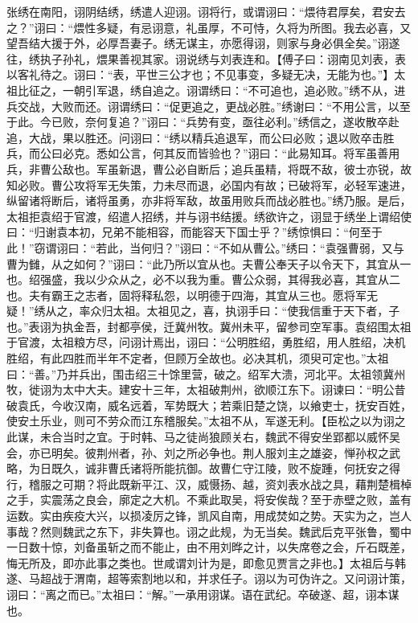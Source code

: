\documentclass[12pt,UTF8]{ctexbook}
\begin{document}
张绣在南阳，诩阴结绣，绣遣人迎诩。诩将行，或谓诩曰：“煨待君厚矣，君安去之？”诩曰：“煨性多疑，有忌诩意，礼虽厚，不可恃，久将为所图。我去必喜，又望吾结大援于外，必厚吾妻子。绣无谋主，亦愿得诩，则家与身必俱全矣。”诩遂往，绣执子孙礼，煨果善视其家。诩说绣与刘表连和。【傅子曰：诩南见刘表，表以客礼待之。诩曰：“表，平世三公才也；不见事变，多疑无决，无能为也。”】太祖比征之，一朝引军退，绣自追之。诩谓绣曰：“不可追也，追必败。”绣不从，进兵交战，大败而还。诩谓绣曰：“促更追之，更战必胜。”绣谢曰：“不用公言，以至于此。今已败，奈何复追？”诩曰：“兵势有变，亟往必利。”绣信之，遂收散卒赴追，大战，果以胜还。问诩曰：“绣以精兵追退军，而公曰必败；退以败卒击胜兵，而公曰必克。悉如公言，何其反而皆验也？”诩曰：“此易知耳。将军虽善用兵，非曹公敌也。军虽新退，曹公必自断后；追兵虽精，将既不敌，彼士亦锐，故知必败。曹公攻将军无失策，力未尽而退，必国内有故；已破将军，必轻军速进，纵留诸将断后，诸将虽勇，亦非将军敌，故虽用败兵而战必胜也。”绣乃服。是后，太祖拒袁绍于官渡，绍遣人招绣，并与诩书结援。绣欲许之，诩显于绣坐上谓绍使曰：“归谢袁本初，兄弟不能相容，而能容天下国士乎？”绣惊惧曰：“何至于此！”窃谓诩曰：“若此，当何归？”诩曰：“不如从曹公。”绣曰：“袁强曹弱，又与曹为雠，从之如何？”诩曰：“此乃所以宜从也。夫曹公奉天子以令天下，其宜从一也。绍强盛，我以少众从之，必不以我为重。曹公众弱，其得我必喜，其宜从二也。夫有霸王之志者，固将释私怨，以明德于四海，其宜从三也。愿将军无疑！”绣从之，率众归太祖。太祖见之，喜，执诩手曰：“使我信重于天下者，子也。”表诩为执金吾，封都亭侯，迁冀州牧。冀州未平，留参司空军事。袁绍围太祖于官渡，太祖粮方尽，问诩计焉出，诩曰：“公明胜绍，勇胜绍，用人胜绍，决机胜绍，有此四胜而半年不定者，但顾万全故也。必决其机，须臾可定也。”太祖曰：“善。”乃并兵出，围击绍三十馀里营，破之。绍军大溃，河北平。太祖领冀州牧，徙诩为太中大夫。建安十三年，太祖破荆州，欲顺江东下。诩谏曰：“明公昔破袁氏，今收汉南，威名远着，军势既大；若乘旧楚之饶，以飨吏士，抚安百姓，使安土乐业，则可不劳众而江东稽服矣。”太祖不从，军遂无利。【臣松之以为诩之此谋，未合当时之宜。于时韩、马之徒尚狼顾关右，魏武不得安坐郢都以威怀吴会，亦已明矣。彼荆州者，孙、刘之所必争也。荆人服刘主之雄姿，惮孙权之武略，为日既久，诚非曹氏诸将所能抗御。故曹仁守江陵，败不旋踵，何抚安之得行，稽服之可期？将此既新平江、汉，威慑扬、越，资刘表水战之具，藉荆楚楫棹之手，实震荡之良会，廓定之大机。不乘此取吴，将安俟哉？至于赤壁之败，盖有运数。实由疾疫大兴，以损凌厉之锋，凯风自南，用成焚如之势。天实为之，岂人事哉？然则魏武之东下，非失算也。诩之此规，为无当矣。魏武后克平张鲁，蜀中一日数十惊，刘备虽斩之而不能止，由不用刘晔之计，以失席卷之会，斤石既差，悔无所及，即亦此事之类也。世咸谓刘计为是，即愈见贾言之非也。】太祖后与韩遂、马超战于渭南，超等索割地以和，并求任子。诩以为可伪许之。又问诩计策，诩曰：“离之而已。”太祖曰：“解。”一承用诩谋。语在武纪。卒破遂、超，诩本谋也。
\end{document}
